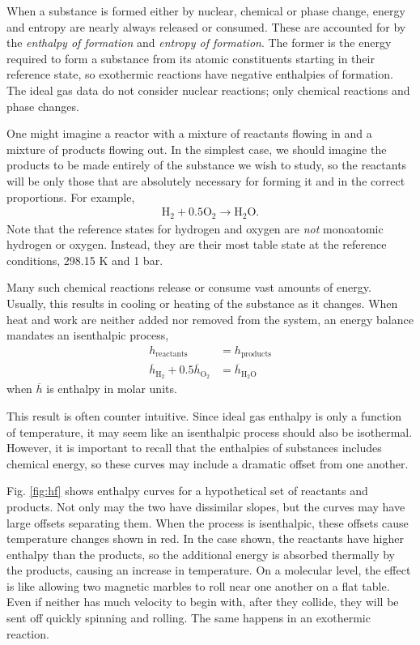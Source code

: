 When a substance is formed either by nuclear, chemical or phase change, energy and entropy are nearly always released or consumed.  These are accounted for by the \emph{enthalpy of formation} and \emph{entropy of formation}.  The former is the energy required to form a substance from its atomic constituents starting in their reference state, so exothermic reactions have negative enthalpies of formation.  The ideal gas data do not consider nuclear reactions; only chemical reactions and phase changes.  

One might imagine a reactor with a mixture of reactants flowing in and a mixture of products flowing out.  In the simplest case, we should imagine the products to be made entirely of the substance we wish to study, so the reactants will be only those that are absolutely necessary for forming it and in the correct proportions.  For example,
\begin{align}
\mathrm{H}_2 + 0.5 \mathrm{O}_2 \rightarrow \mathrm{H}_2 \mathrm{O}.
\end{align}
Note that the reference states for hydrogen and oxygen are \emph{not} monoatomic hydrogen or oxygen.  Instead, they are their most table state at the reference conditions, 298.15 K and 1 bar.

Many such chemical reactions release or consume vast amounts of energy.  Usually, this results in cooling or heating of the substance as it changes.  When heat and work are neither added nor removed from the system, an energy balance mandates an isenthalpic process,
\begin{align}
h_\mathrm{reactants} &= h_\mathrm{products}\nonumber\\
\overline{h}_{\mathrm{H}_2} + 0.5 \overline{h}_{\mathrm{O}_2} &= \overline{h}_{\mathrm{H}_2\mathrm{O}}
\end{align}
when $\overline{h}$ is enthalpy in molar units.

This result is often counter intuitive.  Since ideal gas enthalpy is only a function of temperature, it may seem like an isenthalpic process should also be isothermal.  However, it is important to recall that the enthalpies of substances includes chemical energy, so these curves may include a dramatic offset from one another.

Fig. \ref{fig:hf} shows enthalpy curves for a hypothetical set of reactants and products.  Not only may the two have dissimilar slopes, but the curves may have large offsets separating them.  When the process is isenthalpic, these offsets cause temperature changes shown in red.  In the case shown, the reactants have higher enthalpy than the products, so the additional energy is absorbed thermally by the products, causing an increase in temperature.  On a molecular level, the effect is like allowing two magnetic marbles to roll near one another on a flat table.  Even if neither has much velocity to begin with, after they collide, they will be sent off quickly spinning and rolling.  The same happens in an exothermic reaction.

